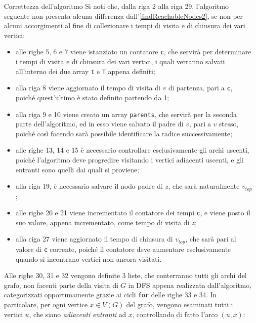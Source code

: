 \documentclass[a4paper, 12pt]{report}
\begin{document}
    \begin{framedobs}{Correttezza dell'algoritmo}
        Si noti che, dalla riga 2 alla riga 29, l'algoritmo seguente non presenta alcuna differenza dall'\cref{findReachableNodes2}, se non per alcuni accorgimenti al fine di collezionare i tempi di visita e di chiusura dei vari vertici:

        \begin{itemize}
            \item alle righe 5, 6 e 7 viene istanziato un contatore \texttt{c}, che servirà per determinare i tempi di visita e di chiusura dei vari vertici, i quali verranno salvati all'interno dei due array \texttt{t} e \texttt{T} appena definiti;
            \item alla riga 8 viene aggiornato il tempo di visita di $v$ di partenza, pari a \texttt{c}, poiché quest'ultimo è stato definito partendo da 1;
            \item alla riga 9 e 10 viene creato un array \texttt{parents}, che servirà per la seconda parte dell'algoritmo, ed in esso viene salvato il padre di $v$, pari a $v$ stesso, poiché così facendo sarà possibile identificare la radice successivamente;
            \item alle righe 13, 14 e 15 è necessario controllare esclusivamente gli archi uscenti, poiché l'algoritmo deve progredire visitando i vertici adiacenti uscenti, e gli entranti sono quelli dai quali si proviene;
            \item alla riga 19, è necessario salvare il nodo padre di $z$, che sarà naturalmente $v_{top}$;
            \item alle righe 20 e 21 viene incrementato il contatore dei tempi \texttt{c}, e viene posto il suo valore, appena incrementato, come tempo di visita di $z$;
            \item alla riga 27 viene aggiornato il tempo di chiusura di $v_{top}$, che sarà pari al valore di \texttt{c} corrente, poiché il contatore deve aumentare esclusivamente quando si incontrano vertici non ancora visitati.
        \end{itemize}

        Alle righe 30, 31 e 32 vengono definite 3 liste, che conterranno tutti gli archi del grafo, non facenti parte della visita di $G$ in DFS appena realizzata dall'algoritmo, categorizzati opportunamente grazie ai cicli \texttt{for} delle righe 33 e 34. In particolare, per ogni vertice $x \in V(G)$ del grafo, vengono esaminati tutti i vertici $u$, che siano \textit{adiacenti entranti} ad $x$, controllando di fatto l'arco $(u, x)$:


\end{framedobs}
\end{document}
